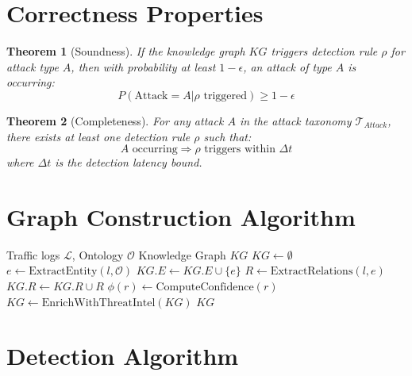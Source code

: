 \documentclass[11pt]{article}
\newtheorem{theorem}{Theorem}
\begin{document}
\section{Correctness Properties}

\begin{theorem}[Soundness]
If the knowledge graph $KG$ triggers detection rule $\rho$ for attack type $A$, then with probability at least $1 - \epsilon$, an attack of type $A$ is occurring:
\begin{equation}
    P(\text{Attack} = A | \rho \text{ triggered}) \geq 1 - \epsilon
\end{equation}
\end{theorem}

\begin{theorem}[Completeness]
For any attack $A$ in the attack taxonomy $\mathcal{T}_{Attack}$, there exists at least one detection rule $\rho$ such that:
\begin{equation}
    A \text{ occurring} \Rightarrow \rho \text{ triggers within } \Delta t
\end{equation}
where $\Delta t$ is the detection latency bound.
\end{theorem}

\section{Graph Construction Algorithm}

\begin{algorithm}[H]
\caption{Knowledge Graph Construction}
\begin{algorithmic}[1]
\REQUIRE Traffic logs $\mathcal{L}$, Ontology $\mathcal{O}$
\ENSURE Knowledge Graph $KG$
\STATE $KG \leftarrow \emptyset$
    \STATE $e \leftarrow \text{ExtractEntity}(l, \mathcal{O})$
    \STATE $KG.E \leftarrow KG.E \cup \{e\}$
    \STATE $R \leftarrow \text{ExtractRelations}(l, e)$
    \STATE $KG.R \leftarrow KG.R \cup R$
        \STATE $\phi(r) \leftarrow \text{ComputeConfidence}(r)$
    \ENDFOR
\ENDFOR
\STATE $KG \leftarrow \text{EnrichWithThreatIntel}(KG)$
\RETURN $KG$
\end{algorithmic}
\end{algorithm}

\section{Detection Algorithm}
\end{document}
